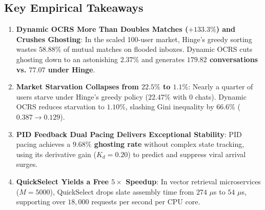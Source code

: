\documentclass[11pt,letterpaper]{article}
\theoremstyle{definition}
\theoremstyle{plain}
\theoremstyle{remark}
\begin{document}
\begin{table}[htbp]
\centering
{}
\caption{Wall-clock latency benchmark across candidate pool sizes $M$ ($K=20$).}
\label{tab:latency_benchmark}
\end{table}

\subsection{Key Empirical Takeaways}
\begin{enumerate}[leftmargin=2em]
    \item \textbf{Dynamic OCRS More Than Doubles Matches ($+133.3\%$) and Crushes Ghosting}:
    In the scaled 100-user market, Hinge's greedy sorting wastes $58.88\%$ of mutual matches on flooded inboxes. Dynamic OCRS cuts ghosting down to an astonishing \textbf{$2.37\%$} and generates \textbf{$179.82$ conversations vs. $77.07$ under Hinge}.
    \item \textbf{Market Starvation Collapses from $22.5\%$ to $1.1\%$}:
    Nearly a quarter of users starve under Hinge's greedy policy ($22.47\%$ with 0 chats). Dynamic OCRS reduces starvation to $1.10\%$, slashing Gini inequality by $66.6\%$ ($0.387 \to 0.129$).
    \item \textbf{PID Feedback Dual Pacing Delivers Exceptional Stability}:
    PID pacing achieves a \textbf{$9.68\%$ ghosting rate} without complex state tracking, using its derivative gain ($K_d = 0.20$) to predict and suppress viral arrival surges.
    \item \textbf{QuickSelect Yields a Free $5\times$ Speedup}:
    In vector retrieval microservices ($M=5000$), QuickSelect drops slate assembly time from $274$ $\mu$s to $54$ $\mu$s, supporting over $18,000$ requests per second per CPU core.
\end{enumerate}
\end{document}
